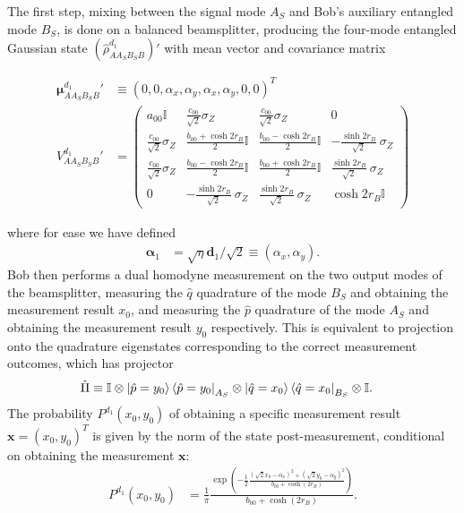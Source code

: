 \documentclass[%
 reprint,
 superscriptaddress,
 amsmath,
 amssymb,
 aps,
 pra,
]{revtex4-2}
\newcommand{\id}{\mathbb{I}}
\newcommand{\sz}{\sigma_Z}
\begin{document}
The first step, mixing between the signal mode $A_S$ and Bob's auxiliary entangled mode $B_S$, is done on a balanced beamsplitter, producing the four-mode entangled Gaussian state $(\hat \rho_{AA_SB_SB}^{d_1})'$ with mean vector and covariance matrix
\begin{widetext}
    \begin{align}
        \bm{\mu}_{AA_SB_SB}^{d_1}{'} &\equiv (0, 0, \alpha_x, \alpha_y, \alpha_x, \alpha_y, 0, 0)^T  \\
        V_{AA_SB_SB}^{d_1}{'} &= \begin{pmatrix}
            a_{00} \id & \frac{c_{00}}{\sqrt{2}} \sz & \frac{c_{00}}{\sqrt{2}} \sz & 0 \\
            \frac{c_{00}}{\sqrt{2}} \sz & \frac{b_{00} + \cosh2r_B}{2} \id & \frac{b_{00} - \cosh2r_B}{2} \id & -\frac{\sinh 2r_B}{\sqrt{2}} \ \sz \\
            \frac{c_{00}}{\sqrt{2}} \sz & \frac{b_{00} - \cosh 2r_B}{2} \id & \frac{b_{00} + \cosh 2r_B}{2} \id & \frac{\sinh 2r_B}{\sqrt{2}} \ \sz \\
            0 & -\frac{\sinh 2r_B}{\sqrt{2}} \ \sz & \frac{\sinh 2r_B}{\sqrt{2}} \ \sz & \cosh 2r_B \id
        \end{pmatrix} \label{eq:pre_measurement_cov}
    \end{align}
\end{widetext}
where for ease we have defined 
\begin{align}
    \bm{\alpha}_1 &= \sqrt{\eta} \bm{d}_1 / \sqrt{2} \equiv (\alpha_x, \alpha_y).
\end{align}
Bob then performs a dual homodyne measurement on the two output modes of the beamsplitter, measuring the $\hat q$ quadrature of the mode $B_S$ and obtaining the measurement result $x_0$, and measuring the $\hat p$ quadrature of the mode $A_S$ and obtaining the measurement result $y_0$ respectively. This is equivalent to projection onto the quadrature eigenstates corresponding to the correct measurement outcomes, which has projector
\begin{align}
    \hat \Pi &\equiv \id \otimes \ket{\hat p = y_0}\bra{\hat p = y_0}_{A_S} \otimes \ket{\hat q = x_0}\bra{\hat q = x_0}_{B_S} \otimes \id.
\end{align}
The probability $P^{d_1}(x_0, y_0)$ of obtaining a specific measurement result $\bm{x} = (x_0, y_0)^T$ is given by the norm of the state post-measurement, conditional on obtaining the measurement $\bm{x}$:
\begin{align}
    P^{d_1}(x_0, y_0) &= \frac{1}{\pi}\frac{\exp \left(-\frac{1}{2}\frac{(\sqrt{2}x_0-\alpha_x)^2+(\sqrt{2}y_0-\alpha_y)^2}{b_{00} + \cosh (2 r_B)}\right)}{b_{00}+\cosh(2r_B)}.
\end{align}
\end{document}

